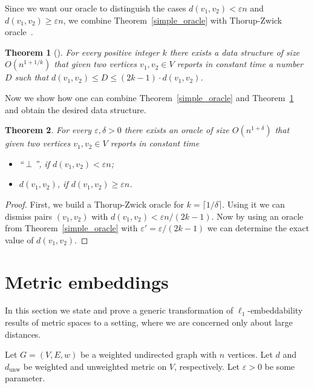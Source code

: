 \documentclass{article}
\newcommand{\dunw}{d_{\mathrm{unw}}}
\newcommand{\eps}{\varepsilon}
\newtheorem{theorem}{Theorem}
\begin{document}
    Since we want our oracle to distinguish the cases $d(v_1, v_2) < \eps n$ and $d(v_1, v_2) \geq \eps n$, we combine Theorem~\ref{simple_oracle}
    with Thorup-Zwick oracle~\cite{TZ05}.

    \begin{theorem}[\cite{TZ05}]
        \label{thorup_zwick}
        For every positive integer $k$ there exists a data structure of size $O(n^{1 + 1/k})$ that given two vertices $v_1, v_2 \in V$ reports
        in constant time a number $D$ such that $d(v_1, v_2) \leq D \leq (2k - 1) \cdot d(v_1, v_2)$.
    \end{theorem}

    Now we show how one can combine Theorem~\ref{simple_oracle} and Theorem~\ref{thorup_zwick} and obtain the desired data structure.

    \begin{theorem}
        For every $\eps, \delta > 0$
        there exists an oracle of size $O(n^{1 + \delta})$ that given two vertices $v_1, v_2 \in V$ reports in constant time
        \begin{itemize}
            \item ``$\perp$'', if $d(v_1, v_2) < \eps n$;
            \item $d(v_1, v_2)$, if $d(v_1, v_2) \geq \eps n$.
        \end{itemize}
    \end{theorem}
    \begin{proof}
        First, we build a Thorup-Zwick oracle for $k = \lceil 1 / \delta \rceil$.
        Using it we can dismiss pairs $(v_1, v_2)$ with $d(v_1, v_2) < \eps n / (2k - 1)$.
        Now by using an oracle from Theorem~\ref{simple_oracle} with $\eps' = \eps / (2k - 1)$ we can determine the exact value of $d(v_1, v_2)$.
    \end{proof}

    \section{Metric embeddings}
    \label{metric_embeddings}

    In this section we state and prove a generic transformation of $\ell_1$-embeddability results of metric spaces to a setting, where we are concerned
    only about large distances.

    Let $G = (V, E, w)$ be a weighted undirected graph with $n$ vertices.
    Let $d$ and $\dunw$ be weighted and unweighted metric on $V$, respectively.
    Let $\eps > 0$ be some parameter.
\end{document}
